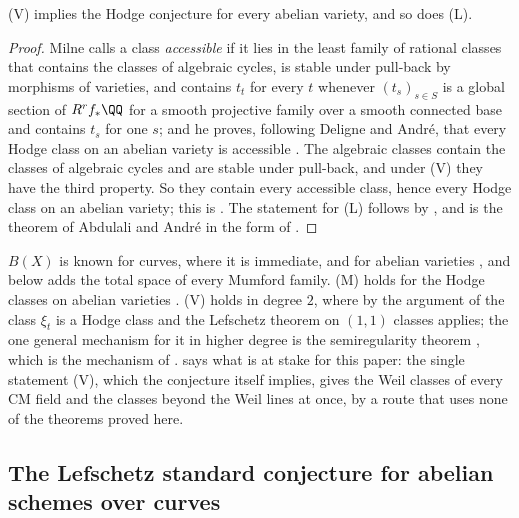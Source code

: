 \begin{theorem}\label{thm:vhcab}
\textup{(V)} implies the Hodge conjecture for every abelian variety, and so
does \textup{(L)}.
\end{theorem}

\begin{proof}
Milne calls a class \emph{accessible} if it lies in the least family of
rational classes that contains the classes of algebraic cycles, is stable
under pull-back by morphisms of varieties, and contains $t_{t}$ for every $t$
whenever $(t_{s})_{s\in S}$ is a global section of $R^{r}f_{*}\QQ$ for a
smooth projective family over a smooth connected base and contains $t_{s}$
for one $s$; and he proves, following Deligne and Andr\'e, that every Hodge
class on an abelian variety is accessible \cite[\S5.1, Theorem~3]{Mil20}.
The algebraic classes contain the classes of algebraic cycles and are stable
under pull-back, and under \textup{(V)} they have the third property. So they
contain every accessible class, hence every Hodge class on an abelian
variety; this is \cite[Remark~2]{Mil20}. The statement for \textup{(L)}
follows by , and is the theorem of Abdulali and Andr\'e in
the form of \cite[Theorem~4]{Mil20}.
\end{proof}

\begin{remark}\label{rem:lmvknown}
$B(X)$ is known for curves, where it is immediate,
and for abelian varieties \cite[\S2]{Kle68}, and 
below adds the total space of every Mumford family. \textup{(M)} holds for the Hodge
classes on abelian varieties \cite[Th\'eor\`eme~0.6.2]{And96b}.
\textup{(V)} holds in degree $2$, where by the argument of
 the class $\xi_{t}$ is a Hodge class and the Lefschetz
theorem on $(1,1)$ classes applies; the one general mechanism for it in
higher degree is the semiregularity theorem \cite{Blo72,BF03,Pri24}, which is the
mechanism of .  says what is at
stake for this paper: the single statement \textup{(V)}, which the conjecture
itself implies, gives the Weil classes of every CM field and the classes
beyond the Weil lines at once, by a route that uses none of the theorems
proved here.
\end{remark}

\subsection{The Lefschetz standard conjecture for abelian schemes over curves}
\label{ssec:newlefschetz}

